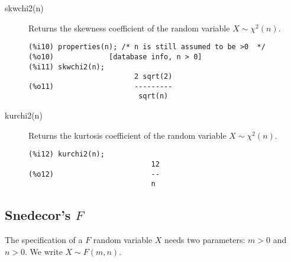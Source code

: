 \documentclass[12pt,a4paper]{article}
\begin{document}
\begin{description}
\item[skwchi2(n)] Returns the skewness coefficient of the random variable $X \sim \chi^2(n)$.

\begin{verbatim}
(%i10) properties(n); /* n is still assumed to be >0  */
(%o10)             [database info, n > 0]
(%i11) skwchi2(n);
                         2 sqrt(2)
(%o11)                   ---------
                          sqrt(n)
\end{verbatim}

\item[kurchi2(n)] Returns the kurtosis coefficient of the random variable $X \sim \chi^2(n)$.

\begin{verbatim}
(%i12) kurchi2(n);
                             12
(%o12)                       --
                             n
\end{verbatim}

\end{description}

\subsection{Snedecor's $F$}

The specification of a $F$ random variable $X$ needs two parameters: $m > 0$ and $n > 0$. We write $X \sim F(m,n)$.
\end{document}
